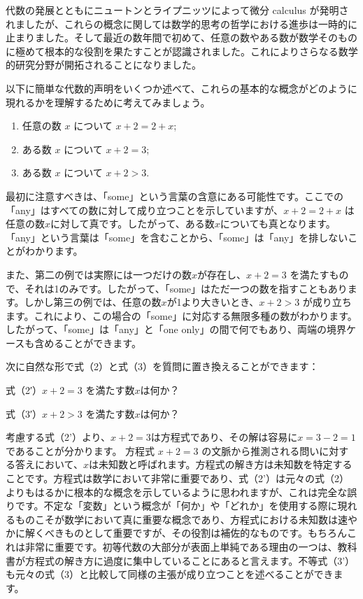 \documentclass[a4paper,11pt,openany]{ltjsbook}
\begin{document}
代数の発展とともにニュートンとライプニッツによって微分 calculus が発明されましたが、これらの概念に関しては数学的思考の哲学における進歩は一時的に止まりました。そして最近の数年間で初めて、任意の数やある数が数学そのものに極めて根本的な役割を果たすことが認識されました。これによりさらなる数学的研究分野が開拓されることになりました。

以下に簡単な代数的声明をいくつか述べて、これらの基本的な概念がどのように現れるかを理解するために考えてみましょう。

\begin{enumerate}[label=(\arabic*)]
\item 任意の数 $x$ について $x + 2 = 2 + x$;
\item ある数 $x$ について $x + 2 = 3$;
\item ある数 $x$ について $x + 2 > 3$.
\end{enumerate}

最初に注意すべきは、「some」という言葉の含意にある可能性です。ここでの「any」はすべての数に対して成り立つことを示していますが、$x + 2 = 2 + x$ は任意の数$x$に対して真です。したがって、ある数$x$についても真となります。「any」という言葉は「some」を含むことから、「some」は「any」を排しないことがわかります。

また、第二の例では実際には一つだけの数$x$が存在し、$x + 2 = 3$ を満たすもので、それは1のみです。したがって、「some」はただ一つの数を指すこともあります。しかし第三の例では、任意の数$x$が1より大きいとき、$x + 2 > 3$ が成り立ちます。これにより、この場合の「some」に対応する無限多種の数がわかります。したがって、「some」は「any」と「one only」の間で何でもあり、両端の境界ケースも含めることができます。

次に自然な形で式（2）と式（3）を質問に置き換えることができます：

式（2′）$x + 2 = 3$ を満たす数$x$は何か？

式（3′）$x + 2 > 3$ を満たす数$x$は何か？

考慮する式（2'）より、$x + 2 = 3$は方程式であり、その解は容易に$x = 3 - 2 = 1$であることが分かります。
方程式 $x + 2 = 3$ の文脈から推測される問いに対する答えにおいて、$x$は未知数と呼ばれます。方程式の解き方は未知数を特定することです。方程式は数学において非常に重要であり、式（2'）は元々の式（2）よりもはるかに根本的な概念を示しているように思われますが、これは完全な誤りです。不定な「変数」という概念が「何か」や「どれか」を使用する際に現れるものこそが数学において真に重要な概念であり、方程式における未知数は速やかに解くべきものとして重要ですが、その役割は補佐的なものです。もちろんこれは非常に重要です。初等代数の大部分が表面上単純である理由の一つは、教科書が方程式の解き方に過度に集中していることにあると言えます。不等式（3'）も元々の式（3）と比較して同様の主張が成り立つことを述べることができます。
\end{document}
